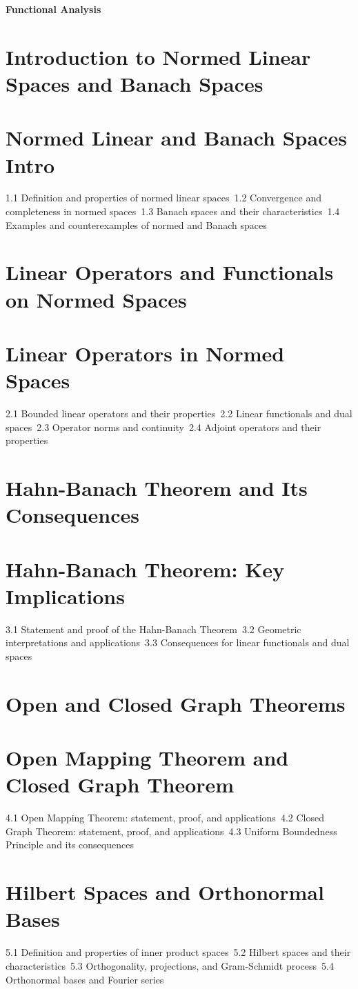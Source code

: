 {\LARGE \bf{Functional Analysis}}
\section{Introduction to Normed Linear Spaces and Banach Spaces}
\section{Normed Linear and Banach Spaces Intro}
1.1 Definition and properties of normed linear spaces\
1.2 Convergence and completeness in normed spaces\
1.3 Banach spaces and their characteristics\
1.4 Examples and counterexamples of normed and Banach spaces\
\section{Linear Operators and Functionals on Normed Spaces}
\section{Linear Operators in Normed Spaces}
2.1 Bounded linear operators and their properties\
2.2 Linear functionals and dual spaces\
2.3 Operator norms and continuity\
2.4 Adjoint operators and their properties\
\section{Hahn-Banach Theorem and Its Consequences}
\section{Hahn-Banach Theorem: Key Implications}
3.1 Statement and proof of the Hahn-Banach Theorem\
3.2 Geometric interpretations and applications\
3.3 Consequences for linear functionals and dual spaces\
\section{Open and Closed Graph Theorems}
\section{Open Mapping Theorem and Closed Graph Theorem}
4.1 Open Mapping Theorem: statement, proof, and applications\
4.2 Closed Graph Theorem: statement, proof, and applications\
4.3 Uniform Boundedness Principle and its consequences\
\section{Hilbert Spaces and Orthonormal Bases}
5.1 Definition and properties of inner product spaces\
5.2 Hilbert spaces and their characteristics\
5.3 Orthogonality, projections, and Gram-Schmidt process\
5.4 Orthonormal bases and Fourier series\
